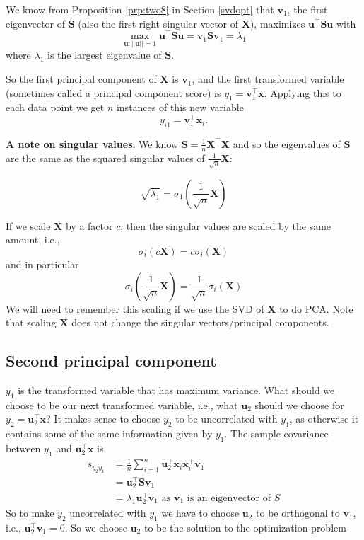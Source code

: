 \documentclass[]{book}
\theoremstyle{definition}
\theoremstyle{definition}
\theoremstyle{definition}
\theoremstyle{remark}
\begin{document}
We know from Proposition \ref{prp:two8} in Section \ref{svdopt} that \(\mathbf v_1\), the first eigenvector of \(\mathbf S\) (also the first right singular vector of \(\mathbf X\)), maximizes \(\mathbf u^\top \mathbf S\mathbf u\) with
\[  \max_{\mathbf u: ||\mathbf u||=1} \mathbf u^\top \mathbf S\mathbf u= \mathbf v_1 \mathbf S\mathbf v_1 =\lambda_1\]
where \(\lambda_1\) is the largest eigenvalue of \(\mathbf S\).

So the first principal component of \(\mathbf X\) is \(\mathbf v_1\), and the first transformed variable (sometimes called a principal component score) is \(y_1 = \mathbf v_1 ^\top \mathbf x\).
Applying this to each data point we get \(n\) instances of this new variable
\[y_{i1} = \mathbf v_1 ^\top \mathbf x_i.\]

\textbf{A note on singular values}: We know \(\mathbf S= \frac{1}{n}\mathbf X^\top\mathbf X\) and so the eigenvalues of \(\mathbf S\) are the same as the squared singular values of \(\frac{1}{\sqrt{n}} \mathbf X\):

\[\sqrt{\lambda_1} = \sigma_1\left(\frac{1}{\sqrt{n}} \mathbf X\right)\]

If we scale \(\mathbf X\) by a factor \(c\), then the singular values are scaled by the same amount, i.e.,
\[\sigma_i(c\mathbf X)=c\sigma_i(\mathbf X)\]
and in particular
\[ \sigma_i\left(\frac{1}{\sqrt{n}} \mathbf X\right) = \frac{1}{\sqrt{n}} \sigma_i(\mathbf X)\]
We will need to remember this scaling if we use the SVD of \(\mathbf X\) to do PCA. Note that scaling \(\mathbf X\) does not change the singular vectors/principal components.

\hypertarget{second-principal-component}{%
\subsection{Second principal component}\label{second-principal-component}}

\(y_1\) is the transformed variable that has maximum variance. What should we choose to be our next transformed variable, i.e., what \(\mathbf u_2\) should we choose for \(y_2 = \mathbf u_2^\top \mathbf x\)? It makes sense to choose \(y_2\) to be uncorrelated with \(y_1\), as otherwise it contains some of the same information given by \(y_1\). The sample covariance between \(y_1\) and \(\mathbf u_2^\top \mathbf x\) is
\begin{align*}
s_{y_2y_1} &=\frac{1}{n}\sum_{i=1}^n \mathbf u_2^\top \mathbf x_i \mathbf x_i^\top \mathbf v_1\\ 
&= \mathbf u_2^\top \mathbf S\mathbf v_1\\
& = \lambda_1 \mathbf u_2^\top \mathbf v_1 \mbox{ as } \mathbf v_1 \mbox{ is an eigenvector of } S
\end{align*}
So to make \(y_2\) uncorrelated with \(y_1\) we have to choose \(\mathbf u_2\) to be orthogonal to \(\mathbf v_1\), i.e., \(\mathbf u_2^\top \mathbf v_1=0\). So we choose \(\mathbf u_2\) to be the solution to the optimization problem
\end{document}
